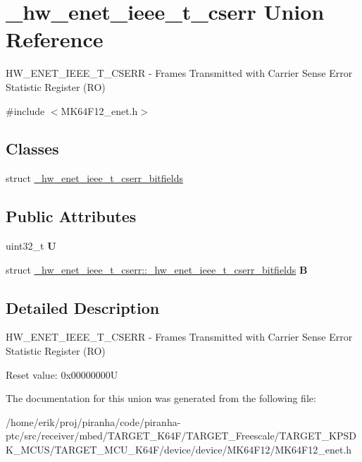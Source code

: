 \hypertarget{union__hw__enet__ieee__t__cserr}{}\section{\+\_\+hw\+\_\+enet\+\_\+ieee\+\_\+t\+\_\+cserr Union Reference}
\label{union__hw__enet__ieee__t__cserr}


H\+W\+\_\+\+E\+N\+E\+T\+\_\+\+I\+E\+E\+E\+\_\+\+T\+\_\+\+C\+S\+E\+RR -\/ Frames Transmitted with Carrier Sense Error Statistic Register (RO)  




{\ttfamily \#include $<$M\+K64\+F12\+\_\+enet.\+h$>$}

\subsection*{Classes}
\begin{DoxyCompactItemize}
\item 
struct \hyperlink{struct__hw__enet__ieee__t__cserr_1_1__hw__enet__ieee__t__cserr__bitfields}{\+\_\+hw\+\_\+enet\+\_\+ieee\+\_\+t\+\_\+cserr\+\_\+bitfields}
\end{DoxyCompactItemize}
\subsection*{Public Attributes}
\begin{DoxyCompactItemize}
\item 
uint32\+\_\+t {\bfseries U}\hypertarget{union__hw__enet__ieee__t__cserr_ac35e378fccf16b7c96efb94ab20c9efd}{}\label{union__hw__enet__ieee__t__cserr_ac35e378fccf16b7c96efb94ab20c9efd}

\item 
struct \hyperlink{struct__hw__enet__ieee__t__cserr_1_1__hw__enet__ieee__t__cserr__bitfields}{\+\_\+hw\+\_\+enet\+\_\+ieee\+\_\+t\+\_\+cserr\+::\+\_\+hw\+\_\+enet\+\_\+ieee\+\_\+t\+\_\+cserr\+\_\+bitfields} {\bfseries B}\hypertarget{union__hw__enet__ieee__t__cserr_acf6ba57f7299fc19677414fb7679b0f5}{}\label{union__hw__enet__ieee__t__cserr_acf6ba57f7299fc19677414fb7679b0f5}

\end{DoxyCompactItemize}


\subsection{Detailed Description}
H\+W\+\_\+\+E\+N\+E\+T\+\_\+\+I\+E\+E\+E\+\_\+\+T\+\_\+\+C\+S\+E\+RR -\/ Frames Transmitted with Carrier Sense Error Statistic Register (RO) 

Reset value\+: 0x00000000U 

The documentation for this union was generated from the following file\+:\begin{DoxyCompactItemize}
\item 
/home/erik/proj/piranha/code/piranha-\/ptc/src/receiver/mbed/\+T\+A\+R\+G\+E\+T\+\_\+\+K64\+F/\+T\+A\+R\+G\+E\+T\+\_\+\+Freescale/\+T\+A\+R\+G\+E\+T\+\_\+\+K\+P\+S\+D\+K\+\_\+\+M\+C\+U\+S/\+T\+A\+R\+G\+E\+T\+\_\+\+M\+C\+U\+\_\+\+K64\+F/device/device/\+M\+K64\+F12/M\+K64\+F12\+\_\+enet.\+h\end{DoxyCompactItemize}
